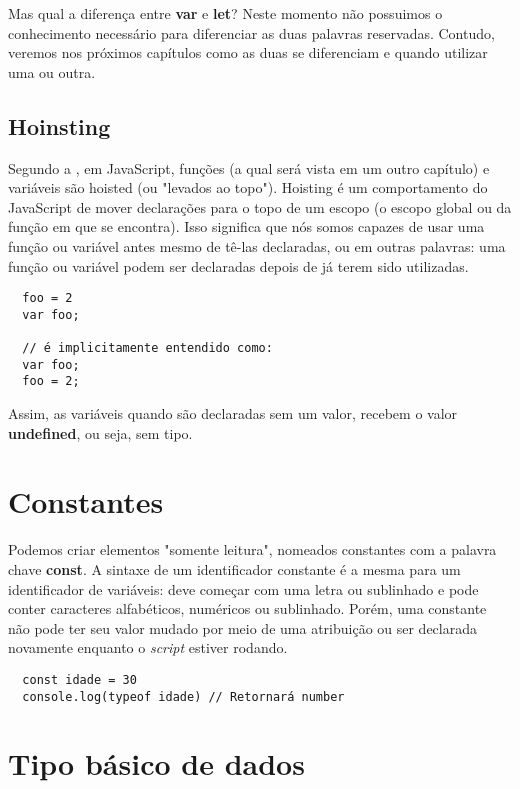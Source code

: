 Mas qual a diferença entre \textbf{var} e \textbf{let}? Neste momento não 
possuimos o conhecimento necessário para diferenciar as duas palavras 
reservadas. Contudo, veremos nos próximos capítulos como as duas se diferenciam e quando utilizar uma ou outra.

\subsection{Hoinsting}

Segundo a , em JavaScript, funções (a qual será 
vista em um outro capítulo) e variáveis são hoisted (ou "levados ao topo"). 
Hoisting é um comportamento do JavaScript de mover declarações para o topo de um escopo (o escopo global ou da função em que se encontra). Isso significa que nós somos capazes de usar uma função ou variável antes mesmo de tê-las declaradas, ou em outras palavras: uma função ou variável podem ser declaradas depois de já terem sido utilizadas.

\begin{lstlisting}
  foo = 2
  var foo;

  // é implicitamente entendido como:
  var foo;
  foo = 2;
\end{lstlisting}

Assim, as variáveis quando são declaradas sem um valor, recebem o valor \textbf
{undefined}, ou seja, sem tipo.

\section{Constantes}

Podemos criar elementos "somente leitura", nomeados constantes com a palavra 
chave \textbf{const}. A sintaxe de um identificador constante é a mesma para um 
identificador de variáveis: deve começar com uma letra ou sublinhado e pode 
conter caracteres alfabéticos, numéricos ou sublinhado. Porém, uma constante 
não pode ter seu valor mudado por meio de uma atribuição ou ser declarada 
novamente enquanto o \textit{script} estiver rodando.

\begin{lstlisting}
  const idade = 30
  console.log(typeof idade) // Retornará number
\end{lstlisting}

\section{Tipo básico de dados}

